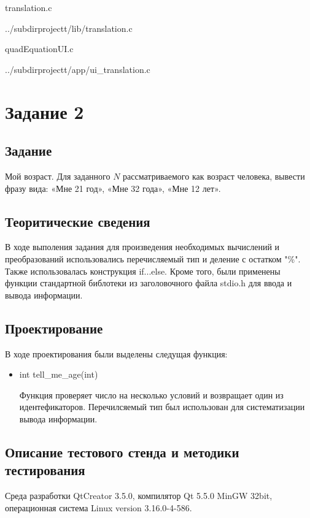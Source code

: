 \documentclass[12pt,a4paper]{report}
\begin{document}
translation.c

{../subdirprojectt/lib/translation.c}

\vspace{\baselineskip}

quadEquationUI.c

{../subdirprojectt/app/ui_translation.c}


\section{Задание 2}
\subsection{Задание}

Мой возраст. Для заданного $N$ рассматриваемого как возраст человека, вывести фразу вида: «Мне 21 год», «Мне 32 года», «Мне 12 лет». 

\subsection{Теоритические сведения}

В ходе выполения задания для произведения необходимых вычислений и преобразований использовались перечисляемый тип и деление с остатком "\%". Также использовалась конструкция if...else. Кроме того, были применены функции стандартной библотеки из заголовочного файла stdio.h для ввода и вывода информации.

\subsection{Проектирование}


В ходе проектирования были выделены следущая функция:

\begin{itemize}
	\item int tell_me_age(int)

	Функция проверяет число на несколько условий и возвращает один из идентефикаторов. Перечилсяемый тип был использован для систематизации вывода информации.
	
\end{itemize}


\subsection{Описание тестового стенда и методики тестирования}
Среда разработки QtCreator 3.5.0, компилятор Qt 5.5.0 MinGW 32bit, операционная система Linux version 3.16.0-4-586.
\end{document}
